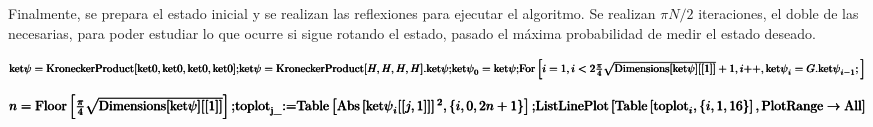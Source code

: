 Finalmente, se prepara el estado inicial y se realizan las reflexiones para ejecutar el algoritmo. Se realizan $\pi N /2$ iteraciones, el doble de las necesarias, para poder estudiar lo que ocurre si sigue rotando el estado, pasado el máxima probabilidad de medir el estado deseado.

\begin{doublespace}
\noindent\(\pmb{\text{ket$\psi $}=\text{KroneckerProduct}[\text{ket0},\text{ket0},\text{ket0},\text{ket0}];}\\
\pmb{\text{ket$\psi $}=\text{KroneckerProduct}[H,H,H,H].\text{ket$\psi $};}\\
\pmb{\text{ket$\psi $}_0=\text{ket$\psi $};}\\
\pmb{\text{For}\left[i=1,i<2\frac{\pi }{4}\sqrt{\text{Dimensions}[\text{ket$\psi $}][[1]]}+1,i\text{++},\text{ket$\psi $}_i=G.\text{ket$\psi $}_{i-1};\right]}\)
\end{doublespace}

\begin{doublespace}
\noindent\(\pmb{n=\text{Floor}\left[\frac{\pi }{4}\sqrt{\text{Dimensions}[\text{ket$\psi $}][[1]]}\right];}\\
\pmb{\text{toplot}_{\text{j$\_$}}\text{:=}\text{Table}\left[\text{Abs}\left[\text{ket$\psi $}_i[[j,1]]\right]{}^2,\{i,0,2n+1\}\right];}\\
\pmb{\text{ListLinePlot}\left[\text{Table}\left[\text{toplot}_i,\{i,1,16\}\right],\text{PlotRange}\to \text{All}\right]}\)
\end{doublespace}

%
%
%
%


